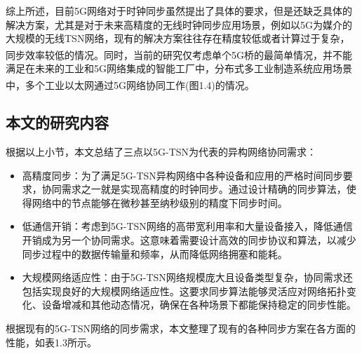 \documentclass[UTF8,a4paper,12pt]{ctexart}
\numberwithin{equation}{section}
\begin{document}
综上所述，目前5G网络对于时钟同步虽然提出了具体的要求，但是还缺乏具体的解决方案，尤其是对于未来高精度的无线时钟同步应用场景，例如以5G为媒介的大规模的无线TSN网络，现有的解决方案往往存在精度较低或者计算过于复杂，同步效率较低的情况。同时，当前的研究仅考虑单个5G桥的最简单情况\textsuperscript{\cite{9557468}}，并不能满足在未来的工业和5G网络集成的智能工厂中，分布式多工业制造系统应用场景中，多个工业以太网通过5G网络协同工作(图1.4)的情况\textsuperscript{\cite{8402373}}。
\begin{figure}[htb] 
\end{figure}

\subsection{本文的研究内容}
根据以上小节，本文总结了三点以5G-TSN为代表的异构网络协同需求：
\begin{itemize}
	\item  高精度同步：为了满足5G-TSN异构网络中各种设备和应用的严格时间同步要求，协同需求之一就是实现高精度的时钟同步。通过设计精确的同步算法，使得网络中的节点能够在微秒甚至纳秒级别的精度下同步时间。
	\item 低通信开销：考虑到5G-TSN网络的高带宽利用率和大量设备接入，降低通信开销成为另一个协同需求。这意味着需要设计高效的同步协议和算法，以减少同步过程中的数据传输量和频率，从而降低网络拥塞和能耗。
	\item 大规模网络适应性：由于5G-TSN网络规模庞大且设备类型复杂，协同需求还包括实现良好的大规模网络适应性。这要求同步算法能够灵活应对网络拓扑变化、设备增减和其他动态情况，确保在各种场景下都能保持稳定的同步性能。
\end{itemize}
根据现有的5G-TSN网络的同步需求，本文整理了现有的各种同步方案在各方面的性能，如表1.3所示。
  
\end{document}
